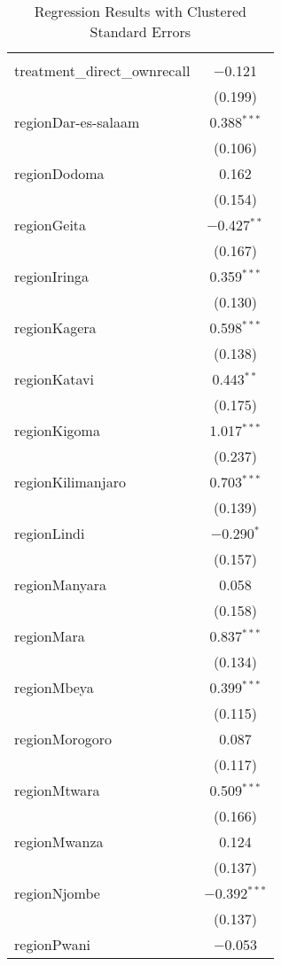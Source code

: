 
\begin{table}[!htbp] \centering 
  \caption{Regression Results with Clustered Standard Errors} 
  \label{} 
\begin{tabular}{@{\extracolsep{5pt}}lc} 
\\[-1.8ex]\hline 
\hline \\[-1.8ex] 
 treatment\_direct\_ownrecall & $-$0.121 \\ 
  & (0.199) \\ 
  regionDar-es-salaam & 0.388$^{***}$ \\ 
  & (0.106) \\ 
  regionDodoma & 0.162 \\ 
  & (0.154) \\ 
  regionGeita & $-$0.427$^{**}$ \\ 
  & (0.167) \\ 
  regionIringa & 0.359$^{***}$ \\ 
  & (0.130) \\ 
  regionKagera & 0.598$^{***}$ \\ 
  & (0.138) \\ 
  regionKatavi & 0.443$^{**}$ \\ 
  & (0.175) \\ 
  regionKigoma & 1.017$^{***}$ \\ 
  & (0.237) \\ 
  regionKilimanjaro & 0.703$^{***}$ \\ 
  & (0.139) \\ 
  regionLindi & $-$0.290$^{*}$ \\ 
  & (0.157) \\ 
  regionManyara & 0.058 \\ 
  & (0.158) \\ 
  regionMara & 0.837$^{***}$ \\ 
  & (0.134) \\ 
  regionMbeya & 0.399$^{***}$ \\ 
  & (0.115) \\ 
  regionMorogoro & 0.087 \\ 
  & (0.117) \\ 
  regionMtwara & 0.509$^{***}$ \\ 
  & (0.166) \\ 
  regionMwanza & 0.124 \\ 
  & (0.137) \\ 
  regionNjombe & $-$0.392$^{***}$ \\ 
  & (0.137) \\ 
  regionPwani & $-$0.053 \\ 

\end{tabular}
\end{table}
